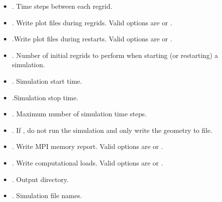 \documentclass[letterpaper,10pt,english]{sphinxmanual}
\begin{document}
\begin{itemize}
\item {} 
\sphinxAtStartPar
{}. Time steps between each regrid.

\item {} 
\sphinxAtStartPar
{}. Write plot files during regrids. Valid options are  or .

\item {} 
\sphinxAtStartPar
{}.Write plot files during restarts. Valid options are  or .

\item {} 
\sphinxAtStartPar
{}. Number of initial regrids to perform when starting (or restarting) a simulation.

\item {} 
\sphinxAtStartPar
{}. Simulation start time.

\item {} 
\sphinxAtStartPar
{}.Simulation stop time.

\item {} 
\sphinxAtStartPar
{}. Maximum number of simulation time steps.

\item {} 
\sphinxAtStartPar
{}. If , do not run the simulation and only write the geometry to file.

\item {} 
\sphinxAtStartPar
{}. Write MPI memory report. Valid options are  or .

\item {} 
\sphinxAtStartPar
{}.  Write computational loads. Valid options are  or .

\item {} 
\sphinxAtStartPar
{}. Output directory.

\item {} 
\sphinxAtStartPar
{}. Simulation file names.


\end{itemize}
\end{document}
